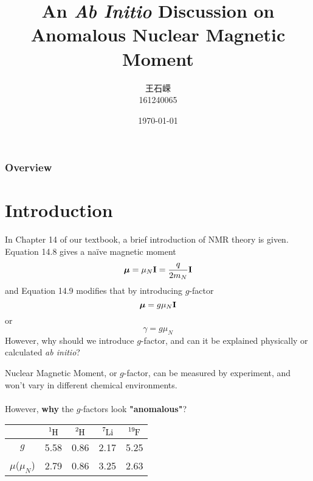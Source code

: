 \documentclass[10pt,aspectratio=43,mathserif]{beamer}
\title[]{An \textsl{Ab Initio} Discussion on\\
	 Anomalous Nuclear Magnetic Moment} %
\author{王石嵘\\161240065} %
\institute[] %
{Kuang Yaming Honors School\\
\medskip
\textit{} %
}
\date{\today} %
\numberwithin{equation}{section}
\begin{document}
\begin{frame}
\titlepage %
\end{frame}

\begin{frame}
\frametitle{Overview} %
\tableofcontents %
\end{frame}


\section{Introduction}
\begin{frame}
In Chapter 14 of our textbook, a brief introduction of NMR theory is given.\\
Equation 14.8 gives a na\"ive magnetic moment
\begin{equation}\label{key}
\bm\mu = \mu_N\vb{I} = \dfrac{q}{2m_N}\vb{I}
\end{equation}
and Equation 14.9 modifies that by introducing $ g $-factor
\begin{equation}\label{key}
\bm\mu = g\mu_N\vb{I}
\end{equation}
or 
\begin{equation}\label{key}
\gamma = g\mu_N
\end{equation}
However, why should we introduce $ g $-factor, and can it be explained physically or calculated \textsl{ab initio}?

\end{frame}

\begin{frame}
Nuclear Magnetic Moment, or $ g $-factor, can be measured by experiment, and won't vary in different chemical environments.\\
~\\
However, \textbf{why} the $ g $-factors look \textbf{"anomalous"}?
\begin{table}
	\centering
	\begin{tabular}{ccccc}
		\hline
		& $ \ce{^1H} $ & $ \ce{^2H} $ & $ \ce{^7Li} $ & $ \ce{^19F} $ \\ \hline
		$ g $ & 5.58 & 0.86 & 2.17 & 5.25 \\
		$ \mu $($ \mu_N $) & 2.79 & 0.86 & 3.25 & 2.63\\
		\hline
	\end{tabular}
\end{table}
\end{frame}
\end{document}
